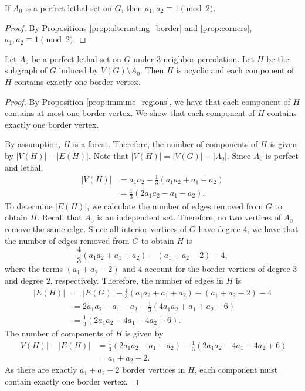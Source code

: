 \begin{prop}
\label{prop:odd_by_odd}
If $A_0$ is a perfect lethal set on $G$, then $a_1, a_2 \equiv 1 \pmod 2$.
\end{prop}

\begin{proof}
By Propositions \ref{prop:alternating_border} and \ref{prop:corners}, $a_1, a_2 \equiv 1 \pmod 2$.
\end{proof}

\begin{prop}
\label{prop:one_border_vertex}
Let $A_0$ be a perfect lethal set on $G$ under $3$-neighbor percolation. Let $H$ be the subgraph of $G$ induced by $V(G) \setminus A_0$. Then $H$ is acyclic and each component of $H$ contains exactly one border vertex.
\end{prop}

\begin{proof}
By Proposition \ref{prop:immune_regions}, we have that each component of $H$ contains at most one border vertex. We show that each component of $H$ contains exactly one border vertex.

By assumption, $H$ is a forest. Therefore, the number of components of $H$ is given by $|V(H)| - |E(H)|$. Note that $|V(H)| = |V(G)| - |A_0|$. Since $A_0$ is perfect and lethal,
\begin{align*}
|V(H)| &= a_1a_2 - \frac{1}{3}(a_1a_2+a_1+a_2) \\
&= \frac{1}{3}(2a_1a_2-a_1-a_2).
\end{align*}
To determine $|E(H)|$, we calculate the number of edges removed from $G$ to obtain $H$. Recall that $A_0$ is an independent set. Therefore, no two vertices of $A_0$ remove the same edge. Since all interior vertices of $G$ have degree 4, we have that the number of edges removed from $G$ to obtain $H$ is
$$\frac{4}{3} \left(a_1a_2+a_1+a_2 \right) - (a_1+a_2-2) - 4,$$
where the terms $(a_1+a_2-2)$ and $4$ account for the border vertices of degree $3$ and degree $2$, respectively. Therefore, the number of edges in $H$ is
\begin{align*}
|E(H)| &= |E(G)| - \frac{4}{3} \left(a_1a_2+a_1+a_2 \right) - (a_1+a_2-2) - 4 \\
&= 2a_1a_2 -a_1 -a_2 - \frac{1}{3}(4a_1a_2+a_1+a_2-6) \\
&= \frac{1}{3}(2a_1a_2-4a_1-4a_2+6).
\end{align*}
The number of components of $H$ is given by
\begin{align*}
|V(H)| -|E(H)| &= \frac{1}{3}(2a_1a_2-a_1-a_2) - \frac{1}{3}(2a_1a_2-4a_1-4a_2+6) \\
&= a_1 + a_2 -2.
\end{align*}
As there are exactly $a_1 + a_2 - 2$ border vertices in $H$, each component must contain exactly one border vertex.
\end{proof}

